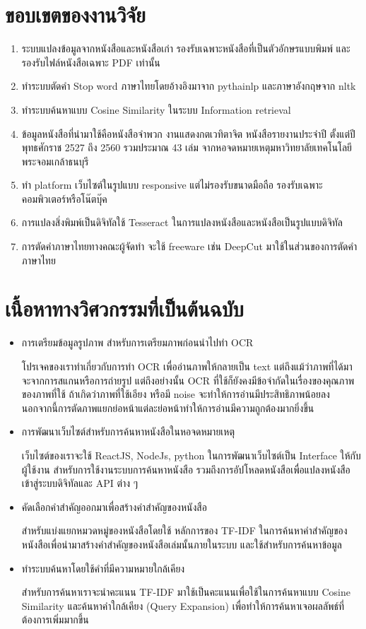 \section{ขอบเขตของงานวิจัย}
\begin{enumerate}
    \item ระบบแปลงข้อมูลจากหนังสือและหนังสือเก่า รองรับเฉพาะหนังสือที่เป็นตัวอักษรแบบพิมพ์ และรองรับไฟล์หนังสือเฉพาะ PDF เท่านั้น
    \item ทำระบบตัดคำ Stop word ภาษาไทยโดยอ้างอิงมาจาก pythainlp และภาษาอังกฤษจาก nltk
    \item ทำระบบค้นหาแบบ Cosine Similarity ในระบบ Information retrieval
    \item ข้อมูลหนังสือที่นำมาใช้คือหนังสือจำพวก งานแสดงกตเวทิตาจิต หนังสือรายงานประจำปี ตั้งแต่ปีพุทธศักราช 2527 ถึง 2560 รวมประมาณ 43 เล่ม จากหอจดหมายเหตุมหาวิทยาลัยเทคโนโลยีพระจอมเกล้าธนบุรี
    \item ทำ platform เว็บไซต์ในรูปแบบ responsive แต่ไม่รองรับขนาดมือถือ รองรับเฉพาะคอมพิวเตอร์หรือโน๊ตบุ๊ค
    \item การแปลงสิ่งพิมพ์เป็นดิจิทัลใช้ Tesseract ในการแปลงหนังสือและหนังสือเป็นรูปแบบดิจิทัล
    \item การตัดคำภาษาไทยทางคณะผู้จัดทำ จะใช้ freeware เช่น DeepCut มาใช้ในส่วนของการตัดคำภาษาไทย
\end{enumerate}
\section{เนื้อหาทางวิศวกรรมที่เป็นต้นฉบับ}
\begin{itemize}
    \item การเตรียมข้อมูลรูปภาพ สำหรับการเตรียมภาพก่อนนำไปทำ OCR 
    
    โปรเจคของเราทำเกี่ยวกับการทำ OCR เพื่ออ่านภาพให้กลายเป็น text แต่ถึงแม้ว่าภาพที่ได้มาจะจากการสแกนหรือการถ่ายรูป แต่ถึงอย่างนั้น OCR ที่ใช้ก็ยังคงมีข้อจำกัดในเรื่องของคุณภาพของภาพที่ใช้ ถ้าเกิดว่าภาพที่ใช้เอียง หรือมี noise จะทำให้การอ่านมีประสิทธิภาพน้อยลง นอกจากนี้การตัดภาพแยกย่อหน้าแต่ละย่อหน้าทำให้การอ่านมีความถูกต้องมากยิ่งขึ้น

    \item การพัฒนาเว็บไซต์สำหรับการค้นหาหนังสือในหอจดหมายเหตุ
    
    เว็บไซต์ของเราจะใช้ ReactJS, NodeJs, python  ในการพัฒนาเว็บไซต์เป็น Interface ให้กับผู้ใช้งาน สำหรับการใช้งานระบบการค้นหาหนังสือ รวมถึงการอัปโหลดหนังสือเพื่อแปลงหนังสือเข้าสู่ระบบดิจิทัลและ API ต่าง ๆ
    
    \item คัดเลือกคำสำคัญออกมาเพื่อสร้างคำสำคัญของหนังสือ
    
    สำหรับแบ่งแยกหมวดหมู่ของหนังสือโดยใช้ หลักการของ TF-IDF ในการค้นหาคำสำคัญของหนังสือเพื่อนำมาสร้างคำสำคัญของหนังสือเล่มนั้นภายในระบบ และใช้สำหรับการค้นหาข้อมูล
    
    \item ทำระบบค้นหาโดยใช้คำที่มีความหมายใกล้เคียง
    
    สำหรับการค้นหาเราจะนำคะแนน TF-IDF มาใช้เป็นคะแนนเพื่อใช้ในการค้นหาแบบ Cosine Similarity และค้นหาคำใกล้เคียง (Query Expansion) เพื่อทำให้การค้นหาเจอผลลัพธ์ที่ต้องการเพิ่มมากขึ้น
    
\end{itemize}
